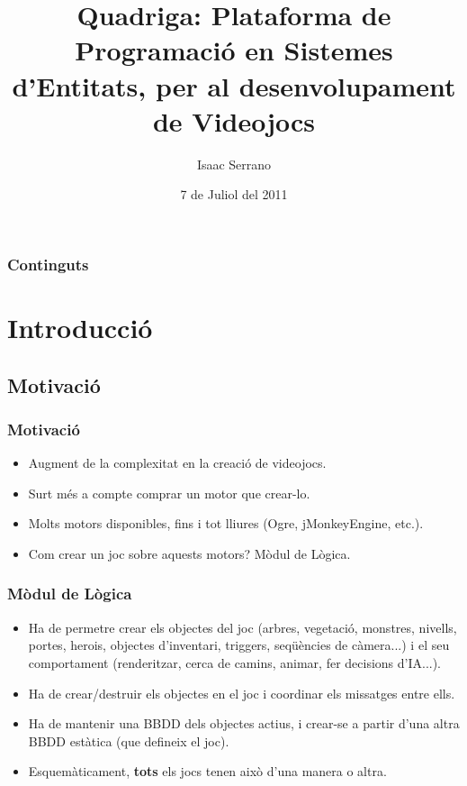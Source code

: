 \documentclass[serif,9pt]{beamer}
\begin{document}
\title[Quadriga]{Quadriga: Plataforma de Programació en Sistemes d'Entitats, per al desenvolupament de Videojocs}  
\author{Isaac Serrano}
\date{7 de Juliol del 2011}

\begin{frame}
\titlepage
\end{frame}

\begin{frame}
\frametitle{Continguts}
\tableofcontents
\end{frame}

\section{Introducció}

  \subsection{Motivació}

    \begin{frame}\frametitle{Motivació}
     \begin{itemize}
      \item Augment de la complexitat en la creació de videojocs. \pause
      \item Surt més a compte comprar un motor que crear-lo. \pause
      \item Molts motors disponibles, fins i tot lliures (Ogre, jMonkeyEngine, etc.).\pause
      \item Com crear un joc sobre aquests motors? Mòdul de Lògica.
     \end{itemize}
    \end{frame}

    \begin{frame}\frametitle{Mòdul de Lògica}
      \begin{itemize}
        \item Ha de permetre crear els objectes del joc (arbres, vegetació, monstres, nivells, portes, herois, objectes d'inventari, triggers, seqüències de càmera...) i el seu comportament (renderitzar, cerca de camins, animar, fer decisions d'IA...).\pause
        \item Ha de crear/destruir els objectes en el joc i coordinar els missatges entre ells.\pause
        \item Ha de mantenir una BBDD dels objectes actius, i crear-se a partir d'una altra BBDD estàtica (que defineix el joc).\pause
        \item Esquemàticament, {\bf tots} els jocs tenen això d'una manera o altra.
      \end{itemize}
    \end{frame}
\end{document}

